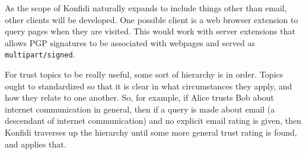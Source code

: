 \documentclass[letterpaper]{www2006-submission}
\begin{document}
As the scope of Konfidi naturally expands to include things other than email, other clients will be developed.  One possible client is a web browser extension to query pages when they are visited.  This would work with server extensions that allows PGP signatures to be associated with webpages and served as \texttt{multipart/signed}.

For trust topics to be really useful, some sort of hierarchy is in order.  Topics ought to standardized so that it is clear in what circumstances they apply, and how they relate to one another.  So, for example, if Alice trusts Bob about internet communication in general, then if a query is made about email (a descendant of internet communication) and no explicit email rating is given, then Konfidi traverses up the hierarchy until some more general trust rating is found, and applies that.



\end{document}
